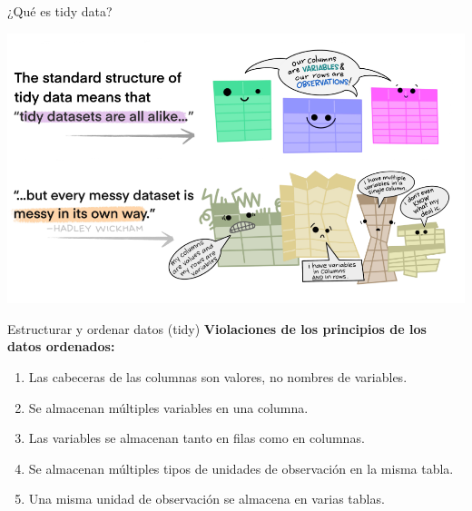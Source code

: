 \documentclass[
  ignorenonframetext,
  aspectratio=169]{beamer}
\begin{document}
\begin{frame}{¿Qué es tidy data?}
\protect\hypertarget{quuxe9-es-tidy-data-1}{}
\begin{center}\includegraphics[width=0.6\linewidth]{Imgs/tidy_data} \end{center}
\end{frame}

\begin{frame}{Estructurar y ordenar datos (tidy)}
\protect\hypertarget{estructurar-y-ordenar-datos-tidy}{}
\textbf{Violaciones de los principios de los datos ordenados:}

\begin{enumerate}
\item
  Las cabeceras de las columnas son valores, no nombres de variables.
\item
  Se almacenan múltiples variables en una columna.\\
\item
  Las variables se almacenan tanto en filas como en columnas.
\item
  Se almacenan múltiples tipos de unidades de observación en la misma
  tabla.
\item
  Una misma unidad de observación se almacena en varias tablas.
\end{enumerate}
\end{frame}
\end{document}
